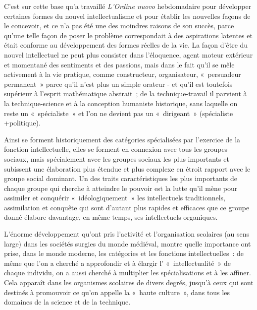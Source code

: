 \documentclass[french,twoside]{book} %
\begin{document}
C'est sur cette base qu’a travaillé \emph{L'Ordine nuovo} hebdomadaire pour développer certaines formes du nouvel intellectualisme et pour établir les nouvelles façons de le concevoir, et ce n’a pas été une des moindres raisons de son succès, parce qu’une telle façon de poser le problème correspondait à des aspirations latentes et était conforme au développement des formes réelles de la vie. La façon d’être du nouvel intellectuel ne peut plus consister dans l’éloquence, agent moteur extérieur et momentané des sentiments et des passions, mais dans le fait qu’il se mêle activement à la vie pratique, comme constructeur, organisateur, « persuadeur permanent » parce qu’il n’est plus un simple orateur - et qu’il est toutefois supérieur à l’esprit mathématique abstrait ; de la technique-travail il parvient à la technique-science et à la conception humaniste historique, sans laquelle on reste un « spécialiste » et l’on ne devient pas un « dirigeant » (spécialiste +politique).\par
Ainsi se forment historiquement des catégories spécialisées par l’exercice de la fonction intellectuelle, elles se forment en connexion avec tous les groupes sociaux, mais spécialement avec les groupes sociaux les plus importants et subissent une élaboration plus étendue et plus complexe en étroit rapport avec le groupe social dominant. Un des traits caractéristiques les plus importants de chaque groupe qui cherche à atteindre le pouvoir est la lutte qu’il mène pour assimiler et conquérir « idéologiquement » les intellectuels traditionnels, assimilation et conquête qui sont d’autant plus rapides et efficaces que ce groupe donné élabore davantage, en même temps, ses intellectuels organiques.\par
L'énorme développement qu’ont pris l’activité et l’organisation scolaires (au sens large) dans les sociétés surgies du monde médiéval, montre quelle importance ont prise, dans le monde moderne, les catégories et les fonctions intellectuelles : de même que l’on a cherché a approfondir et à élargir l’ « intellectualité » de chaque individu, on a aussi cherché à multiplier les spécialisations et à les affiner. Cela apparaît dans les organismes scolaires de divers degrés, jusqu’à ceux qui sont destinés à promouvoir ce qu’on appelle la « haute culture », dans tous les domaines de la science et de la technique.\par
\end{document}
